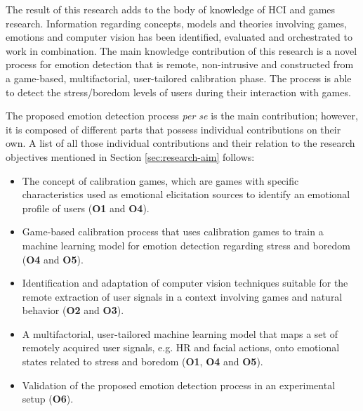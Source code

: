 The result of this research adds to the body of knowledge of HCI and games research. Information regarding concepts, models and theories involving games, emotions and computer vision has been identified, evaluated and orchestrated to work in combination. The main knowledge contribution of this research is a novel process for emotion detection that is remote, non-intrusive and constructed from a game-based, multifactorial, user-tailored calibration phase. The process is able to detect the stress/boredom levels of users during their interaction with games.

The proposed emotion detection process \textit{per se} is the main contribution; however, it is composed of different parts that possess individual contributions on their own. A list of all those individual contributions and their relation to the research objectives mentioned in Section \ref{sec:research-aim} follows:

\begin{itemize}
  \item The concept of calibration games, which are games with specific characteristics used as emotional elicitation sources to identify an emotional profile of users (\textbf{O1} and \textbf{O4}).
  \item Game-based calibration process that uses calibration games to train a machine learning model for emotion detection regarding stress and boredom (\textbf{O4} and \textbf{O5}).
  \item Identification and adaptation of computer vision techniques suitable for the remote extraction of user signals in a context involving games and natural behavior (\textbf{O2} and \textbf{O3}).
  \item A multifactorial, user-tailored machine learning model that maps a set of remotely acquired user signals, e.g. HR and facial actions, onto emotional states related to stress and boredom (\textbf{O1}, \textbf{O4} and \textbf{O5}).
  \item Validation of the proposed emotion detection process in an experimental setup (\textbf{O6}).
\end{itemize}

